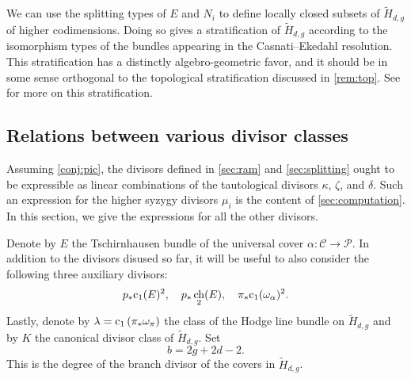 \documentclass{amsart}
\DeclareMathOperator{\ch}{ch}
\renewcommand{\c}{{\rm c}}
\newcommand{\orb}{\mathcal}
\providecommand {\from}{{\colon}}
\numberwithin{equation}{section}
\begin{document}
\begin{remark}
  We can use the splitting types of $E$ and $N_i$ to define locally closed subsets of $\widetilde H_{d,g}$ of higher codimensions.
  Doing so gives a stratification of $\widetilde H_{d,g}$ according to the isomorphism types of the bundles appearing in the Casnati--Ekedahl resolution.
  This stratification has a distinctly algebro-geometric favor, and it should be in some sense orthogonal to the topological stratification discussed in \autoref{rem:top}.
  See \cite{pat:15} for more on this stratification.
\end{remark}

\subsection{Relations between various divisor classes}
Assuming \autoref{conj:pic}, the divisors defined in \autoref{sec:ram} and \autoref{sec:splitting} ought to be expressible as linear combinations of the tautological divisors $\kappa$, $\zeta$, and $\delta$.
Such an expression for the higher syzygy divisors $\mu_i$ is the content of \autoref{sec:computation}.
In this section, we give the expressions for all the other divisors.

Denote by $E$ the Tschirnhausen bundle of the universal cover $\alpha \from {\orb C} \to {\orb P}$.
In addition to the divisors disused so far, it will be useful to also consider the following three auxiliary divisors:
\[ p_* \c_1(E)^2, \quad p_* \ch_2(E), \quad \pi_* \c_1(\omega_\alpha)^2.\]
Lastly, denote by $\lambda = \c_1 \left(\pi_* \omega_\pi\right)$ the class of the Hodge line bundle on $\widetilde H_{d,g}$ and by $K$ the canonical divisor class of $\widetilde H_{d,g}$.
Set 
\[ b = 2g+2d-2.\]
This is the degree of the branch divisor of the covers in $\widetilde H_{d,g}$.
\end{document}
